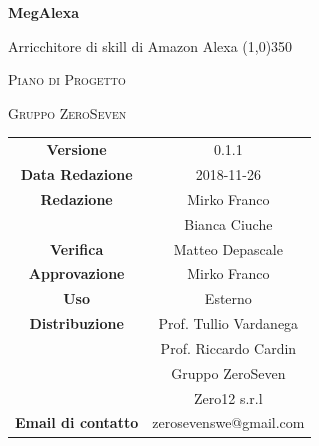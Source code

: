 \documentclass[a4paper,12pt]{book}
\author{Mirko Franco}
\date{2018-11-26}
\begin{document}
\begin{titlepage}
	\centering
	{\huge\bfseries MegAlexa\par}
	Arricchitore di skill di Amazon Alexa
	\line(1,0){350} \\
	{\scshape\LARGE Piano di Progetto \par}
	\vspace{1cm}
	{\scshape Gruppo ZeroSeven \par}
	\logo
	\begin{tabular}{c|c}
		{\hfill \textbf{Versione}} 			& 0.1.1				\\
		{\hfill\textbf{Data Redazione}} 	& 2018-11-26		\\ 
		{\hfill\textbf{Redazione}} 			&  		Mirko Franco	\\	&	Bianca Ciuche	\\ 
		{\hfill\textbf{Verifica}} 				&  	Matteo Depascale				\\ 
		{\hfill\textbf{Approvazione}} 		&  		Mirko Franco			\\ 
		{\hfill\textbf{Uso}} 					& 		Esterno		\\ 
		{\hfill\textbf{Distribuzione}} 			& 			Prof. Tullio Vardanega \\ & Prof. Riccardo Cardin \\ & Gruppo ZeroSeven		\\ & Zero12 s.r.l \\ 
		{\hfill\textbf{Email di contatto}} & zerosevenswe@gmail.com \\
	\end{tabular}
\end{titlepage}
	\label{LastFrontPage}
	\newpage	
	
	\pagestyle{mymain}
	\tableofcontents
	\listoftables
	\listoffigures
	
	
	
	
	
	
			
	\label{LastPage}
\end{document}
